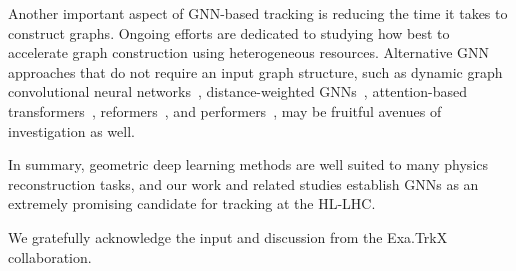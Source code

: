 \documentclass[twocolumn]{svjour3}
\begin{document}


Another important aspect of GNN-based tracking is reducing the time it takes to construct graphs. 
Ongoing efforts are dedicated to studying how best to accelerate graph construction using heterogeneous resources.
Alternative GNN approaches that do not require an input graph structure, such as dynamic graph convolutional neural networks~\cite{DGCNN}, distance-weighted GNNs~\cite{Qasim:2019otl}, attention-based transformers~\cite{vaswani2017attention}, reformers~\cite{kitaev2020reformer}, and performers~\cite{choromanski2021rethinking}, may be fruitful avenues of investigation as well.

In summary, geometric deep learning methods are well suited to many physics reconstruction tasks, and our work and related studies establish GNNs as an extremely promising candidate for tracking at the HL-LHC. 





\begin{acknowledgements}
We gratefully acknowledge the input and discussion from the Exa.TrkX collaboration.
\end{acknowledgements}



\end{document}
